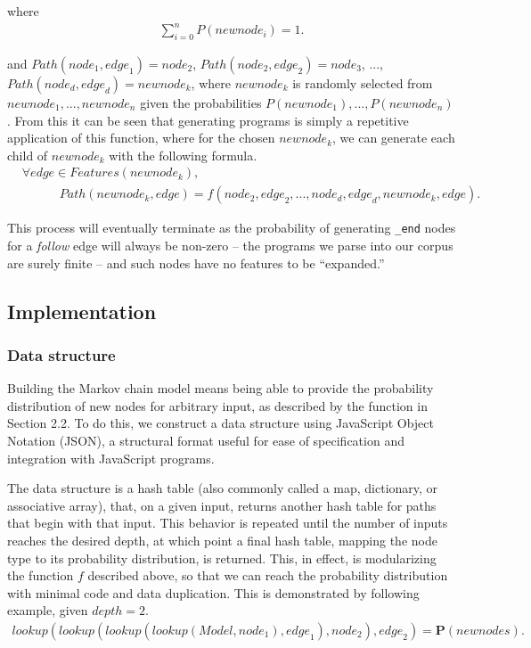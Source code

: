 \documentclass{article}
\begin{document}
where \begin{align*}
\sum\limits_{i = 0}^n P({newnode_i}) = 1.
\end{align*}

and ${Path}({node}_1, {edge}_1) = {node}_2$, ${Path}({node}_2, {edge}_2) = {node}_3$, ..., ${Path}({node}_d, {edge}_d) = {newnode}_k$, where ${newnode}_k$ is randomly selected from ${newnode}_1, ..., {newnode}_n$ given the probabilities \break $P({newnode_1}), ..., P({newnode_n})$. From this it can be seen that generating programs is simply a repetitive application of this function, where for the chosen ${newnode}_k$, we can generate each child of ${newnode}_k$ with the following formula. \begin{align*} &\forall {edge} \in {Features}({newnode}_k), \\
& \hspace{3em} {Path}({newnode}_k, {edge}) = f({node}_2, {edge}_2, ..., {node}_{d}, {edge}_{d}, {newnode}_k, {edge}).
\end{align*}

This process will eventually terminate as the probability of generating {\tt \_end} nodes for a \emph{follow} edge will always be non-zero -- the programs we parse into our corpus are surely finite -- and such nodes have no features to be ``expanded.''

\subsection{Implementation}

\subsubsection{Data structure}

Building the Markov chain model means being able to provide the probability distribution of new nodes for arbitrary input,
as described by the function in Section 2.2. To do this, we construct a data structure using JavaScript Object Notation (JSON),
a structural format useful for ease of specification and integration with JavaScript programs.

The data structure is a hash table (also commonly called a map, dictionary, or associative array), that, on a given input, returns another hash table for paths that begin with that input. This behavior is repeated until the number of inputs reaches the desired depth, at which point a final hash table, mapping the node type to its probability distribution, is returned. This, in effect, is modularizing the function $f$ described above, so that we can reach the probability distribution with minimal code and data duplication. This is demonstrated by following example, given  ${depth} = 2$. \begin{align*}
lookup(lookup(lookup(lookup({Model}, {node}_1), {edge}_1), {node}_2), {edge}_2) = \textbf{P}({newnodes}).
\end{align*}
\end{document}
